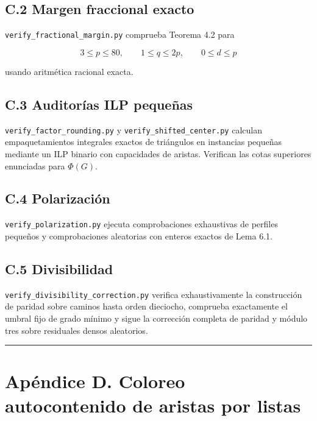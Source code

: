 \documentclass[
  spanish,
  11pt,
  a4paper,
]{article}
\begin{document}
\subsection{C.2 Margen fraccional exacto}\label{c.2-margen-fraccional-exacto}

\texttt{verify\_fractional\_margin.py} comprueba Teorema 4.2 para

\[
3\le p\le80,
\qquad
1\le q\le2p,
\qquad
0\le d\le p
\]

usando aritmética racional exacta.

\subsection{C.3 Auditorías ILP pequeñas}\label{c.3-auditoruxedas-ilp-pequeuxf1as}

\texttt{verify\_factor\_rounding.py} y \texttt{verify\_shifted\_center.py} calculan empaquetamientos integrales exactos de triángulos en instancias pequeñas mediante un ILP binario con capacidades de aristas. Verifican las cotas superiores enunciadas para \(\Phi(G)\).

\subsection{C.4 Polarización}\label{c.4-polarizaciuxf3n}

\texttt{verify\_polarization.py} ejecuta comprobaciones exhaustivas de perfiles pequeños y comprobaciones aleatorias con enteros exactos de Lema 6.1.

\subsection{C.5 Divisibilidad}\label{c.5-divisibilidad}

\texttt{verify\_divisibility\_correction.py} verifica exhaustivamente la construcción de paridad sobre caminos hasta orden dieciocho, comprueba exactamente el umbral fijo de grado mínimo y sigue la corrección completa de paridad y módulo tres sobre residuales densos aleatorios.

\begin{center}\rule{0.5\linewidth}{0.5pt}\end{center}

\section{Apéndice D. Coloreo autocontenido de aristas por listas}\label{apuxe9ndice-d.-coloreo-autocontenido-de-aristas-por-listas}
\end{document}
